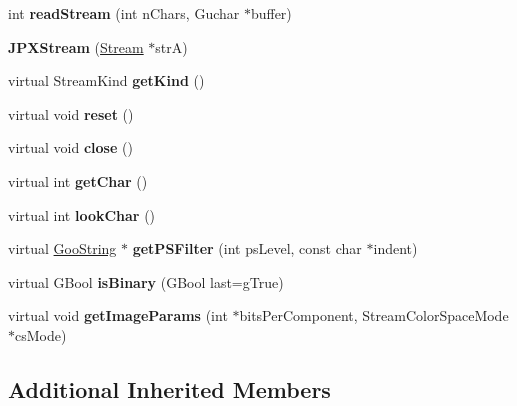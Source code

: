 \begin{DoxyCompactItemize}
\item 
\mbox{\label{class_j_p_x_stream_abc058cf4c4ceff9275fb3286ddc67e28}} 
int {\bfseries read\+Stream} (int n\+Chars, Guchar $\ast$buffer)
\item 
\mbox{\label{class_j_p_x_stream_a93934e2b6491d3ac74fd63ff3b7f0a9d}} 
{\bfseries J\+P\+X\+Stream} (\hyperlink{class_stream}{Stream} $\ast$strA)
\item 
\mbox{\label{class_j_p_x_stream_a6346ad3c5698a8779202da452db08ac0}} 
virtual Stream\+Kind {\bfseries get\+Kind} ()
\item 
\mbox{\label{class_j_p_x_stream_ad5cfed99fd1c674b56156352003dcbcd}} 
virtual void {\bfseries reset} ()
\item 
\mbox{\label{class_j_p_x_stream_a3f633ca6f10fd8990186799157435b36}} 
virtual void {\bfseries close} ()
\item 
\mbox{\label{class_j_p_x_stream_ad889f74a61d45fb913a9c181e0fddda4}} 
virtual int {\bfseries get\+Char} ()
\item 
\mbox{\label{class_j_p_x_stream_a210b1a4c074c4a037dc1009e1ef66432}} 
virtual int {\bfseries look\+Char} ()
\item 
\mbox{\label{class_j_p_x_stream_af29e3dfab9d86986c695a5223d996047}} 
virtual \hyperlink{class_goo_string}{Goo\+String} $\ast$ {\bfseries get\+P\+S\+Filter} (int ps\+Level, const char $\ast$indent)
\item 
\mbox{\label{class_j_p_x_stream_a1ca665d291afb04f85e3bb85a4b2b377}} 
virtual G\+Bool {\bfseries is\+Binary} (G\+Bool last=g\+True)
\item 
\mbox{\label{class_j_p_x_stream_a1de94885ffe6cff41250381d1f5c40ca}} 
virtual void {\bfseries get\+Image\+Params} (int $\ast$bits\+Per\+Component, Stream\+Color\+Space\+Mode $\ast$cs\+Mode)
\end{DoxyCompactItemize}
\subsection*{Additional Inherited Members}


